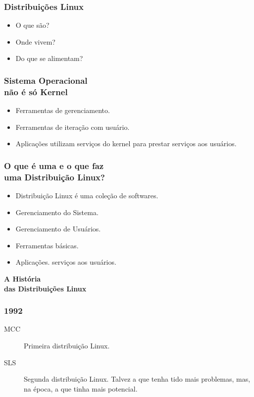\documentclass[aspectratio=169,14pt]{beamer}
\begin{document}
{%
\begin{frame}
    \frametitle{Distribuições Linux}
    \begin{itemize}
        \item{O que são?}
        \item{Onde vivem?}
        \item{Do que se alimentam?}
    \end{itemize}
\end{frame}
}

\begin{frame}
    \frametitle{Sistema Operacional \\ não é só Kernel}
    \begin{itemize}
        \item Ferramentas de gerenciamento.
        \item Ferramentas de iteração com usuário.
        \item Aplicações utilizam serviços do kernel para prestar
        serviços aos usuários.
    \end{itemize}
\end{frame}

\begin{frame}
    \frametitle{O que é uma e o que faz \\ uma Distribuição Linux?}
    \begin{itemize}
        \item Distribuição Linux é uma coleção de softwares.
        \item Gerenciamento do Sistema.
        \item Gerenciamento de Usuários.
        \item Ferramentas básicas.
        \item Aplicações.
        serviços aos usuários.
    \end{itemize}
\end{frame}

\begin{frame}
    \begin{center}
    \Huge \textbf{A História \\ das Distribuições Linux}
    \end{center}
\end{frame}

\begin{frame}
    \frametitle{1992}
    \begin{description}
        \item[MCC] Primeira distribuição Linux.
        \item [SLS] Segunda distribuição Linux. Talvez a que tenha tido
        mais problemas, mas, na época, a que tinha mais potencial.
    \end{description}
\end{frame}
\end{document}
